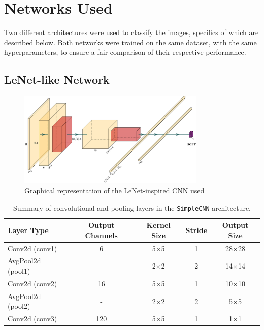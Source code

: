\documentclass{pracalicmgr}
\begin{document}
\section{Networks Used}

Two different architectures were used to classify the images, specifics of which are described below. Both networks were trained on the same dataset, with the same hyperparameters, to ensure a fair comparison of their respective performance.

\subsection{LeNet-like Network}

\begin{figure}[H]
    \centering
    \includegraphics[width=0.8\textwidth]{src/LeNetLike.pdf}
    \caption{Graphical representation of the LeNet-inspired CNN used \cite{Iqbal2018PlotNeuralNet}}
    \label{fig:lenetLike_architecture}
\end{figure}

\begin{table}[H]
\centering
\caption{Summary of convolutional and pooling layers in the \texttt{SimpleCNN} architecture.}
\begin{tabular}{|l|c|c|c|c|}
\hline
\textbf{Layer Type} & \textbf{Output Channels} & \textbf{Kernel Size} & \textbf{Stride} & \textbf{Output Size} \\
\hline
Conv2d (conv1)       & 6   & 5×5 & 1 & 28×28 \\
AvgPool2d (pool1)    & -   & 2×2 & 2 & 14×14 \\
Conv2d (conv2)       & 16  & 5×5 & 1 & 10×10 \\
AvgPool2d (pool2)    & -   & 2×2 & 2 & 5×5 \\
Conv2d (conv3)       & 120 & 5×5 & 1 & 1×1 \\
\hline
\end{tabular}
\label{tab:simplecnn_layers}
\end{table}
\end{document}
